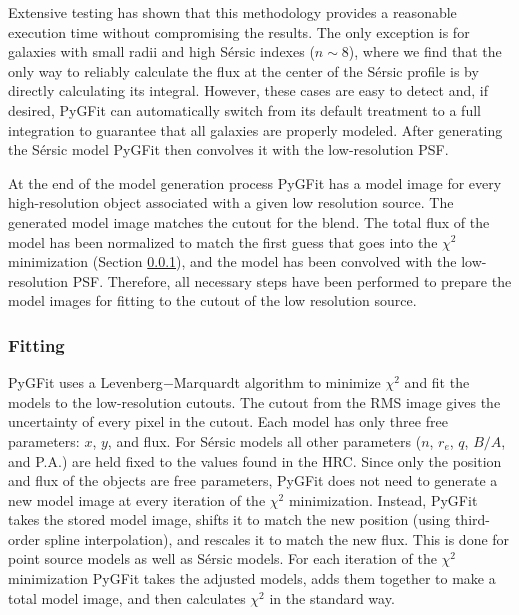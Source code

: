 \documentclass[apj]{emulateapj}
\newcommand{\sersic}{S\'{e}rsic}
\newcommand{\galfit}{GALFIT}
\newcommand{\pygfit}{PyGFit}
\begin{document}
Extensive testing has shown that this methodology provides a reasonable execution time without compromising the results.  The only exception is for galaxies with small radii and high \sersic{} indexes ($n \sim 8$), where we find that the only way to reliably calculate the flux at the center of the \sersic{} profile is by directly calculating its integral.  However, these cases are easy to detect and, if desired, \pygfit{} can automatically switch from its default treatment to a full integration to guarantee that all galaxies are properly modeled.  After generating the \sersic{} model \pygfit{} then convolves it with the low-resolution PSF.

\begin{figure*}
\caption{Original images (top row) and residuals (bottom row) from our \galfit{} and \pygfit{} runs in the core of a high redshift ($z=1.243$) galaxy cluster.  From left to right the images correspond to WFC3/F160W, R, H, and $4.5\mu$m.  The WFC3/F160W image was fit with \galfit{}, while all other bands were fit with \pygfit{}.  All panels show the same field of view, and the scale in the top left panel is 10$^{\prime\prime}$ long.}\label{fig:residuals}
\end{figure*}

At the end of the model generation process \pygfit{} has a model image for every high-resolution object associated with a given low resolution source.  The generated model image matches the cutout for the blend.  The total flux of the model has been normalized to match the first guess that goes into the $\chi^2$ minimization (Section \ref{sec:fitting}), and the model has been convolved with the low-resolution PSF.  Therefore, all necessary steps have been performed to prepare the model images for fitting to the cutout of the low resolution source.

\subsubsection{Fitting}\label{sec:fitting}

\pygfit{} uses a Levenberg$-$Marquardt algorithm to minimize $\chi^2$ and fit the models to the low-resolution cutouts.  The cutout from the RMS image gives the uncertainty of every pixel in the cutout.  Each model has only three free parameters: $x$, $y$, and flux.  For \sersic{} models all other parameters ($n$, $r_e$, $q$, $B/A$, and P.A.) are held fixed to the values found in the HRC.  Since only the position and flux of the objects are free parameters, \pygfit{} does not need to generate a new model image at every iteration of the $\chi^2$ minimization.  Instead, \pygfit{} takes the stored model image, shifts it to match the new position (using third-order spline interpolation), and rescales it to match the new flux.  This is done for point source models as well as \sersic{} models.  For each iteration of the $\chi^2$ minimization \pygfit{} takes the adjusted models, adds them together to make a total model image, and then calculates $\chi^2$ in the standard way.
\end{document}
